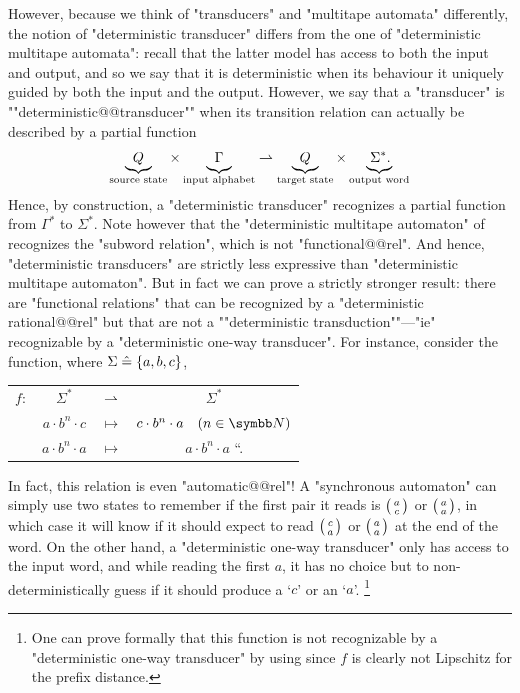 However, because we think of "transducers" and "multitape automata" differently,
the notion of "deterministic transducer" differs from the one of
"deterministic multitape automata": recall that the latter model has access to both the input
and output, and so we say that it is deterministic when its behaviour it uniquely guided
by both the input and the output. However, we say that a "transducer" is
\AP""deterministic@@transducer"" when its transition relation can actually be described
by a partial function
\[
	\underbrace{\;\;Q\;\;}_{\text{source state\vphantom{l}}}
	\times \underbrace{\;\Gamma\vphantom{Q}\;}_{\text{input alphabet\vphantom{l}}}
	\rightharpoonup
	\underbrace{\;\;Q\;\;}_{\text{target state\vphantom{l}}}
	\times \underbrace{\;{\Sigma^*}\vphantom{Q}.\!\;}_{\text{output word\vphantom{l}}}
\]
Hence, by construction, a "deterministic transducer" recognizes a partial function
from $\Gamma^*$ to $\Sigma^*$.
Note however that the "deterministic multitape automaton" of 
recognizes the "subword relation", which is not "functional@@rel".
And hence, "deterministic transducers" are strictly less expressive
than "deterministic multitape automaton".
But in fact we can prove a strictly stronger result:
there are "functional relations" that can be recognized by
a "deterministic rational@@rel" but that are not a
\AP""deterministic transduction""---"ie" recognizable by a "deterministic one-way transducer".
For instance, consider the function, where $\Sigma \mathrel{\hat{=}} \{a,b,c\}$,
\begin{center}
	\begin{tabular}{rccc}
		$f\colon$ & $\Sigma^*$ & $\rightharpoonup$ & $\Sigma^*$ \\
		& $a\cdot b^n \cdot c$ & $\mapsto$ & $c \cdot b^n \cdot a \quad(n\in\N)$ \\
		& $a\cdot b^n \cdot a$ & $\mapsto$ & $a \cdot b^n \cdot a$ \qquad``\quad.
	\end{tabular}
\end{center}
In fact, this relation is even "automatic@@rel"! A "synchronous automaton"
can simply use two states to remember if the first pair it reads is
$\pair{a}{c}$ or $\pair{a}{a}$, in which case it will know if it should expect
to read $\pair{c}{a}$ or $\pair{a}{a}$ at the end of the word.
On the other hand, a "deterministic one-way transducer"
only has access to the input word, and while reading the first $a$, it has no choice
but to non-deterministically guess if it should produce a `$c$' or an `$a$'.%
\footnote{One can prove formally that this function is
not recognizable by a "deterministic one-way transducer"
by using \cite[Theorem~V.4.2]{Sakarovitch2009Elements}
since $f$ is clearly not Lipschitz for the prefix distance.}

